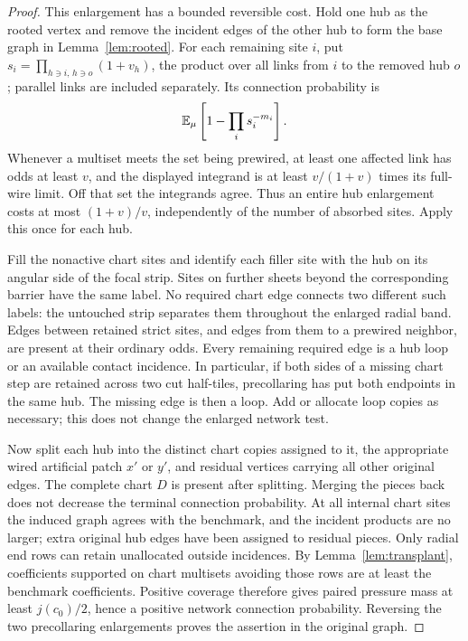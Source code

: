 \begin{proof}
This enlargement has a bounded reversible cost.  Hold one hub as
the rooted vertex and remove the incident edges of the other hub
to form the base graph in Lemma~\ref{lem:rooted}.  For each remaining
site $i$, put $s_i=\prod_{h\ni i,\,h\ni o}(1+v_h)$, the product over all
links from $i$ to the removed hub $o$; parallel links are included
separately.  Its connection probability is
\[
 \mathbb E_\mu\left[1-\prod_i s_i^{-m_i}\right].
\]
Whenever a multiset meets the set being prewired, at least one
affected link has odds at least $v$, and the displayed integrand
is at least \(v/(1+v)\) times its full-wire limit.  Off that set
the integrands agree.  Thus an entire hub enlargement costs at most
\((1+v)/v\), independently of the number of absorbed sites.
Apply this once for each hub.

Fill the nonactive chart sites and identify each filler site with
the hub on its angular side of the focal strip.  Sites on further
sheets beyond the corresponding barrier have the same label.
No required chart edge connects two different such labels: the
untouched strip separates them throughout the enlarged radial
band.  Edges between retained strict sites, and edges from them
to a prewired neighbor, are present at their ordinary odds.
Every remaining required edge is a hub loop or an available
contact incidence.  In particular, if both sides of a missing
chart step are retained across two cut half-tiles, precollaring
has put both endpoints in the same hub.  The missing edge is
then a loop.  Add or allocate loop copies as necessary; this
does not change the enlarged network test.

Now split each hub into the distinct chart copies assigned to it,
the appropriate wired artificial patch \(x'\) or \(y'\), and
residual vertices carrying all other original edges.  The complete
chart \(D\) is present after splitting.  Merging the pieces back
does not decrease the terminal connection probability.  At all internal
chart sites the induced graph agrees with the benchmark, and
the incident products are no larger; extra original hub edges
have been assigned to residual pieces.  Only radial end rows
can retain unallocated outside incidences.  By
Lemma~\ref{lem:transplant}, coefficients supported on chart
multisets avoiding those rows are at least the benchmark
coefficients.  Positive coverage therefore gives paired pressure
mass at least \(j(c_0)/2\), hence a positive network connection
probability.  Reversing the two precollaring enlargements proves
the assertion in the original graph.
\end{proof}

